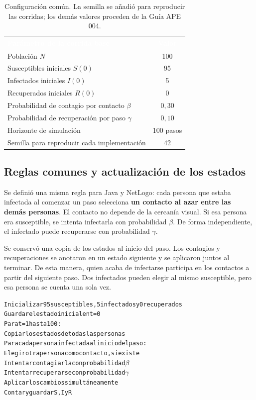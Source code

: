 \documentclass[11pt,a4paper]{article}
\renewcommand{\arraystretch}{1.08}
\newcommand{\cab}[1]{\textbf{\textcolor{white}{#1}}}
\newcommand{\tabestilo}{\arrayrulecolor{borderblue}\setlength{\arrayrulewidth}{0.75pt}\renewcommand{\arraystretch}{1.2}}
\begin{document}
\begin{table}[H]
\centering\tabestilo
\begin{tabularx}{\textwidth}{|Y|c|}
\hline{}\cab{Parámetro de la corrida base} & \cab{Valor} \\ \hline
Población $N$ & 100 \\ \hline
{}Susceptibles iniciales $S(0)$ & 95 \\ \hline
Infectados iniciales $I(0)$ & 5 \\ \hline
{}Recuperados iniciales $R(0)$ & 0 \\ \hline
Probabilidad de contagio por contacto $\beta$ & $0{,}30$ \\ \hline
{}Probabilidad de recuperación por paso $\gamma$ & $0{,}10$ \\ \hline
Horizonte de simulación & 100 pasos \\ \hline
{}Semilla para reproducir cada implementación & 42 \\ \hline
\end{tabularx}
\caption{Configuración común. La semilla se añadió para reproducir las corridas; los demás valores proceden de la Guía APE 004.}
\label{tab:parametros}
\end{table}

\subsection{Reglas comunes y actualización de los estados}
Se definió una misma regla para Java y NetLogo: cada persona que estaba infectada al comenzar un paso selecciona \textbf{un contacto al azar entre las demás personas}. El contacto no depende de la cercanía visual. Si esa persona era susceptible, se intenta infectarla con probabilidad $\beta$. De forma independiente, el infectado puede recuperarse con probabilidad $\gamma$.

Se conservó una copia de los estados al inicio del paso. Los contagios y recuperaciones se anotaron en un estado siguiente y se aplicaron juntos al terminar. De esta manera, quien acaba de infectarse participa en los contactos a partir del siguiente paso. Dos infectados pueden elegir al mismo susceptible, pero esa persona se cuenta una sola vez.

\noindent\begin{minipage}{\textwidth}
\begin{alltt}\small
Inicializar 95 susceptibles, 5 infectados y 0 recuperados
Guardar el estado inicial en t = 0
Para t = 1 hasta 100:
    Copiar los estados de todas las personas
    Para cada persona infectada al inicio del paso:
        Elegir otra persona como contacto, si existe
        Intentar contagiarla con probabilidad \(\beta\)
        Intentar recuperarse con probabilidad \(\gamma\)
    Aplicar los cambios simultáneamente
    Contar y guardar S, I y R
\end{alltt}
\end{minipage}
\end{document}
